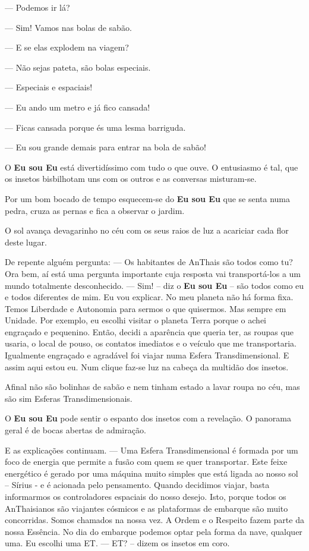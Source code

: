 — Podemos ir lá?

— Sim! Vamos nas bolas de sabão.

— E se elas explodem na viagem?

— Não sejas pateta, são bolas especiais.

— Especiais e espaciais!

— Eu ando um metro e já fico cansada!

— Ficas cansada porque és uma lesma barriguda.

— Eu sou grande demais para entrar na bola de sabão!

O \textbf{Eu sou Eu} está divertidíssimo com tudo o que ouve. O entusiasmo é tal, que os insetos bisbilhotam uns com os outros e as conversas misturam-se.

Por um bom bocado de tempo esquecem-se do \textbf{Eu sou Eu} que se senta numa pedra, cruza as pernas e fica a observar o jardim.

O sol avança devagarinho no céu com os seus raios de luz a acariciar cada flor deste lugar.

De repente alguém pergunta:
\bigbreak
— Os habitantes de AnThais são todos como tu?
\bigbreak
Ora bem, aí está uma pergunta importante cuja resposta vai transportá-los a um mundo totalmente desconhecido.
\bigbreak
— Sim! – diz o \textbf{Eu sou Eu} – são todos como eu e todos diferentes de mim. Eu vou explicar. No meu planeta não há forma fixa. Temos Liberdade e Autonomia para sermos o que quisermos. Mas sempre em Unidade. Por exemplo, eu escolhi visitar o planeta Terra porque o achei engraçado e pequenino. Então, decidi a aparência que queria ter, as roupas que usaria, o local de pouso, os contatos imediatos e o veículo que me transportaria. Igualmente engraçado e agradável foi viajar numa Esfera Transdimensional. E assim aqui estou eu.
\bigbreak
Num clique faz-se luz na cabeça da multidão dos insetos.

Afinal não são bolinhas de sabão e nem tinham estado a lavar roupa no céu, mas são sim Esferas Transdimensionais.

O \textbf{Eu sou Eu} pode sentir o espanto dos insetos com a revelação. O panorama geral é de bocas abertas de admiração.

E as explicações continuam.
\bigbreak
— Uma Esfera Transdimensional é formada por um foco de energia que permite a fusão com quem se quer transportar. Este feixe energético é gerado por uma máquina muito simples que está ligada ao nosso sol – Sírius - e é acionada pelo pensamento. Quando decidimos viajar, basta informarmos os controladores espaciais do nosso desejo. Isto, porque todos os AnThaisianos são viajantes cósmicos e as plataformas de embarque são muito concorridas. Somos chamados na nossa vez. A Ordem e o Respeito fazem parte da nossa Essência. No dia do embarque podemos optar pela forma da nave, qualquer uma. Eu escolhi uma ET.
\bigbreak
— ET? – dizem os insetos em coro.

